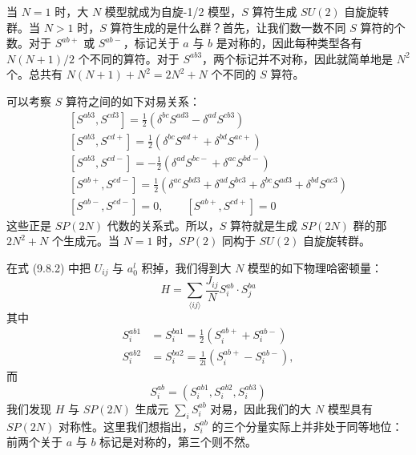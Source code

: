 当 $N=1$ 时，大 $N$ 模型就成为自旋-1/2 模型，$S$ 算符生成 $SU(2)$ 自旋旋转群。当 $N>1$ 时，$S$ 算符生成的是什么群？首先，让我们数一数不同 $S$ 算符的个数。对于 $S^{ab+}$ 或 $S^{ab-}$，标记关于 $a$ 与 $b$ 是对称的，因此每种类型各有 $N(N+1)/2$ 个不同的算符。对于 $S^{ab3}$，两个标记并不对称，因此就简单地是 $N^{2}$ 个。总共有 $N(N+1)+N^{2}=2N^{2}+N$ 个不同的 $S$ 算符。

可以考察 $S$ 算符之间的如下对易关系：
\begin{equation*}
\begin{gathered}
\left[S^{ab3},S^{cd3}\right]=\frac{1}{2}\left(\delta^{bc}S^{ad3}-\delta^{ad}S^{cb3}\right)\\[2pt]
\left[S^{ab3},S^{cd+}\right]=\frac{1}{2}\left(\delta^{bc}S^{ad+}+\delta^{bd}S^{ac+}\right)\\[2pt]
\left[S^{ab3},S^{cd-}\right]=-\frac{1}{2}\left(\delta^{ad}S^{bc-}+\delta^{ac}S^{bd-}\right)\\[2pt]
\left[S^{ab+},S^{cd-}\right]=\frac{1}{2}\left(\delta^{ac}S^{bd3}+\delta^{ad}S^{bc3}+\delta^{bc}S^{ad3}+\delta^{bd}S^{ac3}\right)\\[2pt]
\left[S^{ab-},S^{cd-}\right]=0,\qquad \left[S^{ab+},S^{cd+}\right]=0
\end{gathered}
\end{equation*}
这些正是 $SP(2N)$ 代数的关系式。所以，$S$ 算符就是生成 $SP(2N)$ 群的那 $2N^{2}+N$ 个生成元。当 $N=1$ 时，$SP(2)$ 同构于 $SU(2)$ 自旋旋转群。

在式 (9.8.2) 中把 $U_{ij}$ 与 $a_0^l$ 积掉，我们得到大 $N$ 模型的如下物理哈密顿量：
\begin{equation*}
H=\sum_{\langle ij\rangle}\frac{J_{ij}}{N}S_i^{ab}\cdot S_j^{ba}
\end{equation*}
其中
\begin{equation*}
\begin{aligned}
S_i^{ab1}&=S_i^{ba1}=\frac{1}{2}\left(S_i^{ab+}+S_i^{ab-}\right)\\
S_i^{ab2}&=S_i^{ba2}=\frac{1}{2\mathrm{i}}\left(S_i^{ab+}-S_i^{ab-}\right),
\end{aligned}
\end{equation*}
而
\begin{equation*}
S_i^{ab}=\left(S_i^{ab1},S_i^{ab2},S_i^{ab3}\right)
\end{equation*}
我们发现 $H$ 与 $SP(2N)$ 生成元 $\sum_i S_i^{ab}$ 对易，因此我们的大 $N$ 模型具有 $SP(2N)$ 对称性。这里我们想指出，$S_i^{ab}$ 的三个分量实际上并非处于同等地位：前两个关于 $a$ 与 $b$ 标记是对称的，第三个则不然。

